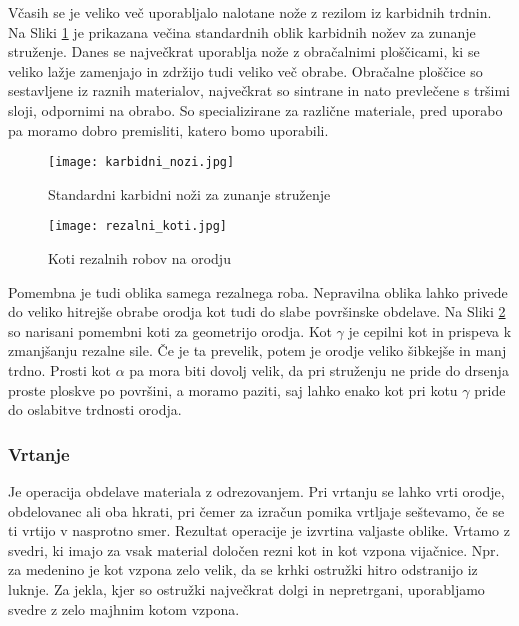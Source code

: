 Včasih se je veliko več uporabljalo nalotane nože z rezilom iz
karbidnih trdnin. Na Sliki \ref{karbidni_nozi} je prikazana večina
standardnih oblik karbidnih nožev za zunanje struženje.
Danes se največkrat uporablja nože z obračalnimi ploščicami,
ki se veliko lažje zamenjajo in zdržijo tudi veliko več obrabe.
Obračalne ploščice so sestavljene iz raznih materialov, največkrat
so sintrane in nato prevlečene s tršimi sloji, odpornimi na obrabo.
So specializirane za različne materiale, pred uporabo pa moramo
dobro premisliti, katero bomo uporabili.

\begin{figure}
	\begin{center}
		\texttt{[image: karbidni\_nozi.jpg]}
		\caption{Standardni karbidni noži za zunanje struženje
			\cite{sts_arhiv_struzenje_karbidni_nozi}}
		\label{karbidni_nozi}
	\end{center}
\end{figure}

\begin{figure}
	\begin{center}
		\texttt{[image: rezalni\_koti.jpg]}
		\caption{Koti rezalnih robov na orodju
			\cite{sts_arhiv_struzenje_rezalni_koti}}
		\label{rezalni_koti}
	\end{center}
\end{figure}

Pomembna je tudi oblika samega rezalnega roba. Nepravilna
oblika lahko privede do veliko hitrejše obrabe orodja kot tudi
do slabe površinske obdelave. Na Sliki \ref{rezalni_koti} so narisani
pomembni koti za geometrijo orodja. Kot \(\gamma\) je cepilni kot in prispeva
k zmanjšanju rezalne sile. Če je ta prevelik, potem je orodje veliko
šibkejše in manj trdno. Prosti kot \(\alpha\) pa mora biti dovolj velik,
da pri struženju ne pride do drsenja proste ploskve po površini, a
moramo paziti, saj lahko enako kot pri kotu \(\gamma\) pride do oslabitve
trdnosti orodja.

\subsubsection{Vrtanje}
Je operacija obdelave materiala z odrezovanjem.
Pri vrtanju se lahko vrti orodje, obdelovanec ali oba hkrati,
pri čemer za izračun pomika vrtljaje seštevamo, če se ti vrtijo
v nasprotno smer. Rezultat operacije je izvrtina valjaste oblike.
Vrtamo z svedri, ki imajo za vsak material določen rezni kot in kot vzpona
vijačnice. Npr. za medenino je kot vzpona zelo velik, da se
krhki ostružki hitro odstranijo iz luknje. Za jekla, kjer so
ostružki največkrat dolgi in nepretrgani, uporabljamo svedre z
zelo majhnim kotom vzpona.

